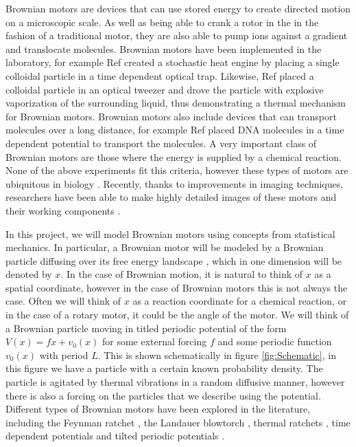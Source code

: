 \documentclass[11pt]{article} %
\begin{document}
Brownian motors are devices that can use stored energy to create directed motion on a microscopic scale. As well as being able to crank a rotor in the in the fashion of a traditional motor, they are also able to pump ions against a gradient and translocate molecules. Brownian motors have been implemented in the laboratory, for example Ref \cite{BlickleBechinger2011} created a stochastic heat engine by placing a single colloidal particle in a time dependent optical trap. Likewise, Ref \cite{Pedro2014} placed a colloidal particle in an optical tweezer and drove the particle with explosive vaporization of the surrounding liquid, thus demonstrating a thermal mechanism for Brownian motors. Brownian motors also include devices that can transport molecules over a long distance, for example Ref \cite{JoelBader1999} placed DNA molecules in a time dependent potential to transport the molecules. A very important class of Brownian motors are those where the energy is supplied by a chemical reaction. None of the above experiments fit this criteria, however these types of motors are ubiquitous in biology \cite{PhillipsQuakeMay2006, Magnasco1994}. Recently, thanks to improvements in imaging techniques, researchers have been able to make highly detailed images of these motors and their working components \cite{YiWeiChang2016}.

In this project, we will model Brownian motors using concepts from statistical mechanics. In particular, a Brownian motor will be modeled by a Brownian particle diffusing over its free energy landscape \cite{Reimann2001}, which in one dimension will be denoted by $x$. In the case of Brownian motion, it is natural to think of $x$ as a spatial coordinate, however in the case of Brownian motors this is not always the case. Often we will think of $x$ as a reaction coordinate for a chemical reaction, or in the case of a rotary motor, it could be the angle of the motor. We will think of a Brownian particle moving in titled periodic potential of the form $V(x) = f x + v_0(x)$ for some external forcing $f$ and some periodic function $v_0(x)$ with period $L$. This is shown schematically in figure \ref{fig:Schematic}, in this figure we have a particle with a certain known probability density. The particle is agitated by thermal vibrations in a random diffusive manner, however there is also a forcing on the particles that we describe using the potential. Different types of Brownian motors have been explored in the literature, including the Feynman ratchet \cite{Feynman1963}, the Landauer blowtorch \cite{Landauer1988}, thermal ratchets \cite{Pedro2014}, time dependent potentials \cite{JoelBader1999,BlickleBechinger2011} and tilted periodic potentials \cite{Leibler1993,Magnasco1994}. 
\end{document}
